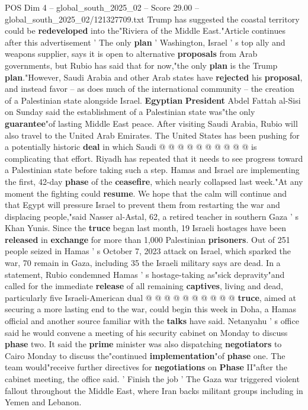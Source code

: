 \begin{textsample}{POS Dim 4 – global\_south\_2025\_02 – Score 29.00 – global\_south\_2025\_02/121327709.txt}
Trump has suggested the coastal territory could be \textbf{redeveloped} into the"Riviera of the Middle East."Article continues after this advertisement ' The only \textbf{plan} ' Washington, Israel ' s top ally and weapons supplier, says it is open to alternative \textbf{proposals} from Arab governments, but Rubio has said that for now,"the only \textbf{plan} is the Trump \textbf{plan}."However, Saudi Arabia and other Arab states have \textbf{rejected} his \textbf{proposal}, and instead favor -- as does much of the international community -- the creation of a Palestinian state alongside Israel. \textbf{Egyptian} \textbf{President} Abdel Fattah al-Sisi on Sunday said the establishment of a Palestinian state was"the only \textbf{guarantee}"of lasting Middle East peace.
After visiting Saudi Arabia, Rubio will also travel to the United Arab Emirates.
The United States has been pushing for a potentially historic \textbf{deal} in which Saudi @ @ @ @ @ @ @ @ @ @ is complicating that effort.
Riyadh has repeated that it needs to see progress toward a Palestinian state before taking such a step.
Hamas and Israel are implementing the first, 42-day \textbf{phase} of the \textbf{ceasefire}, which nearly collapsed last week."At any moment the fighting could \textbf{resume}.
We hope that the calm will continue and that Egypt will pressure Israel to prevent them from restarting the war and displacing people,"said Nasser al-Astal, 62, a retired teacher in southern Gaza ' s Khan Yunis.
Since the \textbf{truce} began last month, 19 Israeli hostages have been \textbf{released} in \textbf{exchange} for more than 1,000 Palestinian \textbf{prisoners}.
Out of 251 people seized in Hamas ' s October 7, 2023 attack on Israel, which sparked the war, 70 remain in Gaza, including 35 the Israeli military says are dead.
In a statement, Rubio condemned Hamas ' s hostage-taking as"sick depravity"and called for the immediate \textbf{release} of all remaining \textbf{captives}, living and dead, particularly five Israeli-American dual @ @ @ @ @ @ @ @ @ @ \textbf{truce}, aimed at securing a more lasting end to the war, could begin this week in Doha, a Hamas official and another source familiar with the \textbf{talks} have said.
Netanyahu ' s office said he would convene a meeting of his security cabinet on Monday to discuss \textbf{phase} two.
It said the \textbf{prime} minister was also dispatching \textbf{negotiators} to Cairo Monday to discuss the"continued \textbf{implementation}"of \textbf{phase} one.
The team would"receive further directives for \textbf{negotiations} on \textbf{Phase} II"after the cabinet meeting, the office said. ' Finish the job ' The Gaza war triggered violent fallout throughout the Middle East, where Iran backs militant groups including in Yemen and Lebanon.

\end{textsample}
